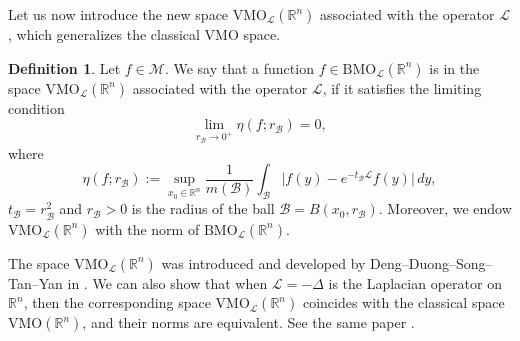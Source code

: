 \documentclass[10pt, reqno]{amsart}
\theoremstyle{definition}
\newtheorem{definition}[theorem]{Definition}
\theoremstyle{remark}
\numberwithin{equation}{section}
\begin{document}
Let us now introduce the new space $\mathrm{VMO}_{\mathcal{L}}(\mathbb R^n)$ associated with the operator $\mathcal{L}$, which generalizes the classical VMO space.
\begin{definition}\label{newvmo}
Let $f\in \mathcal{M}$. We say that a function $f\in \mathrm{BMO}_{\mathcal{L}}(\mathbb R^n)$ is in the space $\mathrm{VMO}_{\mathcal{L}}(\mathbb R^n)$ associated with the operator $\mathcal{L}$, if it satisfies the limiting condition
\begin{equation*}
\lim_{r_{\mathcal{B}}\to 0^{+}}\eta(f;r_{\mathcal{B}})=0,
\end{equation*}
where
\begin{equation}\label{modulus}
\eta(f;r_{\mathcal{B}}):=\sup_{x_0\in\mathbb R^n}\frac{1}{m(\mathcal{B})}
\int_{\mathcal{B}}\big|f(y)-e^{-t_{\mathcal{B}}\mathcal{L}}f(y)\big|\,dy,
\end{equation}
$t_{\mathcal{B}}=r_{\mathcal{B}}^2$ and $r_{\mathcal{B}}>0$ is the radius of the ball $\mathcal{B}=B(x_0,r_{\mathcal{B}})$. Moreover, we endow $\mathrm{VMO}_{\mathcal{L}}(\mathbb R^n)$ with the norm of $\mathrm{BMO}_{\mathcal{L}}(\mathbb R^n)$.
\end{definition}
The space $\mathrm{VMO}_{\mathcal{L}}(\mathbb R^n)$ was introduced and developed by Deng--Duong--Song--Tan--Yan in \cite{d}. We can also show that when $\mathcal{L}=-\Delta$ is the Laplacian operator on $\mathbb R^n$, then the corresponding space $\mathrm{VMO}_{\mathcal{L}}(\mathbb R^n)$ coincides with the classical space $\mathrm{VMO}(\mathbb R^n)$, and their norms are equivalent. See the same paper \cite{d}.
\end{document}
